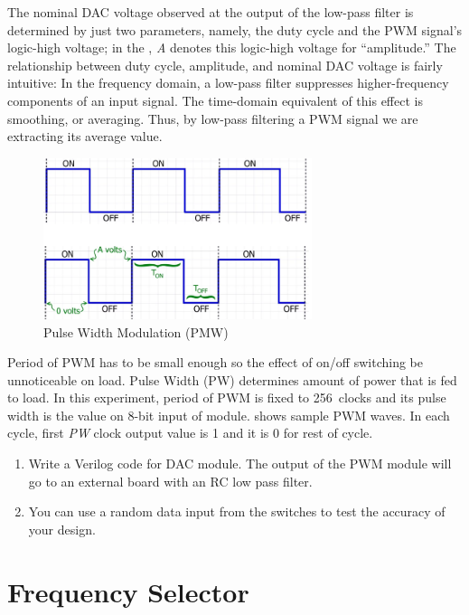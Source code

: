 \documentclass[12pt, logo=tehranDLDL/ut]{tehranDLDL}
\begin{document}
The nominal DAC voltage observed at the output of the low-pass filter is determined by just two parameters, namely,
the duty cycle and the PWM signal’s logic-high voltage;
in the , \textit{A} denotes this logic-high voltage for ``amplitude.''
The relationship between duty cycle, amplitude, and nominal DAC voltage is fairly intuitive:
In the frequency domain, a low-pass filter suppresses higher-frequency components of an input signal. The time-domain equivalent of this effect is smoothing, or averaging. Thus, by low-pass filtering a PWM signal we are extracting its average value.

\begin{figure}
    \centering
    \caption{Pulse Width Modulation (PMW)\label{fig:PMW}}
    \includegraphics[width=0.7\textwidth]{PMW.png}
\end{figure}

Period of PWM has to be small enough so the effect of on/off switching be unnoticeable on load. Pulse Width (PW) determines amount of power that is fed to load.
In this experiment, period of PWM is fixed to 256~clocks and its pulse width is the value on 8-bit input of module.
 shows sample PWM waves. In each cycle, first \textit{PW} clock output value is 1 and it is 0 for rest of cycle.

\begin{enumerate}
    \item Write a Verilog code for DAC module. The output of the PWM module will go to an external board with an RC low pass filter.
    \item You can use a random data input from the switches to test the accuracy of your design.
\end{enumerate}

\designverification{}

\section{Frequency Selector}
\end{document}

